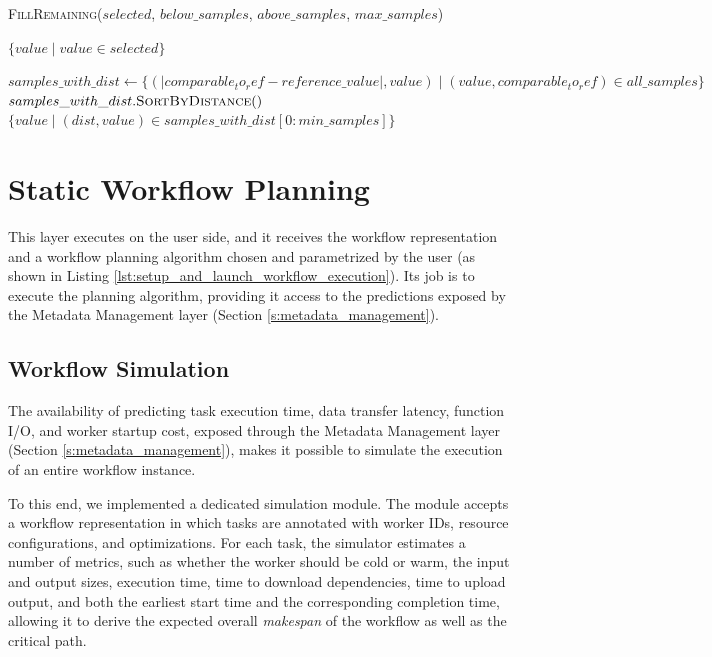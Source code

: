 \begin{algorithm}
\begin{algorithmic}[1]
            \State {}
                \State \textsc{FillRemaining}($selected$, $below\_samples$, $above\_samples$, $max\_samples$)
            \EndIf
            
            \State \Return $\{value \mid value \in selected\}$
        \EndIf
    \EndFor
    
    \State {}
    \State $samples\_with\_dist \gets \{(|comparable_to_ref - reference\_value|, value) \mid (value, comparable_to_ref) \in all\_samples\}$
    \State $samples\_with\_dist.\textsc{SortByDistance}()$
    \State \Return $\{value \mid (dist, value) \in samples\_with\_dist[0:min\_samples]\}$
    
\end{algorithmic}
\end{algorithm}

\section{Static Workflow Planning}
This layer executes on the user side, and it receives the workflow representation and a workflow planning algorithm chosen and parametrized by the user (as shown in Listing \ref{lst:setup_and_launch_workflow_execution}). Its job is to execute the planning algorithm, providing it access to the predictions exposed by the Metadata Management layer (Section \ref{s:metadata_management}).

\subsection{Workflow Simulation}
\label{ss:workflow_simulation}
The availability of predicting task execution time, data transfer latency, function I/O, and worker startup cost, exposed through the Metadata Management layer (Section \ref{s:metadata_management}), makes it possible to simulate the execution of an entire workflow instance.

To this end, we implemented a dedicated simulation module. The module accepts a workflow representation in which tasks are annotated with worker IDs, resource configurations, and optimizations. For each task, the simulator estimates a number of metrics, such as whether the worker should be cold or warm, the input and output sizes, execution time, time to download dependencies, time to upload output, and both the earliest start time and the corresponding completion time, allowing it to derive the expected overall \textit{makespan} of the workflow as well as the critical path.

